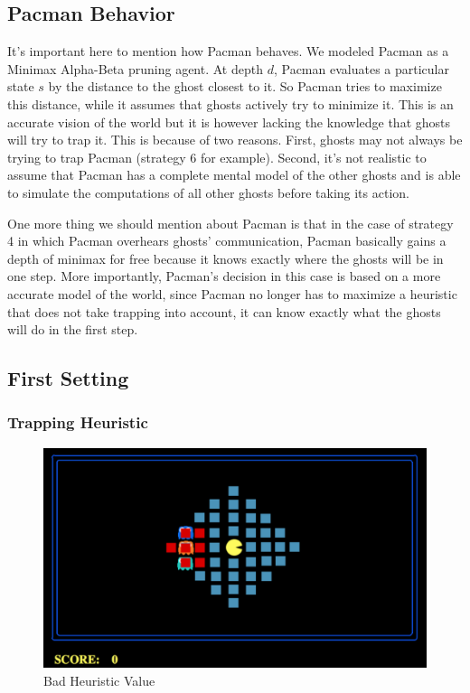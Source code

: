 \documentclass[11pt]{article}
\begin{document}
\begin{multicols}{2}
\subsection{Pacman Behavior}
It's important here to mention how Pacman behaves. We modeled Pacman as a Minimax Alpha-Beta pruning agent. At depth $d$, Pacman evaluates a particular state $s$ by the distance to the ghost closest to it. So Pacman tries to maximize this distance, while it assumes that ghosts actively try to minimize it. This is an accurate vision of the world but it is however lacking the knowledge that ghosts will try to trap it. This is because of two reasons. First, ghosts may not always be trying to trap Pacman (strategy 6 for example). Second, it's not realistic to assume that Pacman has a complete mental model of the other ghosts and is able to simulate the computations of all other ghosts before taking its action.

One more thing we should mention about Pacman is that in the case of strategy 4 in which Pacman overhears ghosts' communication, Pacman basically gains a depth of minimax for free because it knows exactly where the ghosts will be in one step. More importantly, Pacman's decision in this case is based on a more accurate model of the world, since Pacman no longer has to maximize a heuristic that does not take trapping into account, it can know exactly what the ghosts will do in the first step.

\subsection{First Setting}
\subsubsection{Trapping Heuristic}

\begin{figure}[H]
	\includegraphics[width=\columnwidth]{badheuristic.png}
	\caption{Bad Heuristic Value}
	\label{fig:badheuristic}
\end{figure}


\end{multicols}
\end{document}
